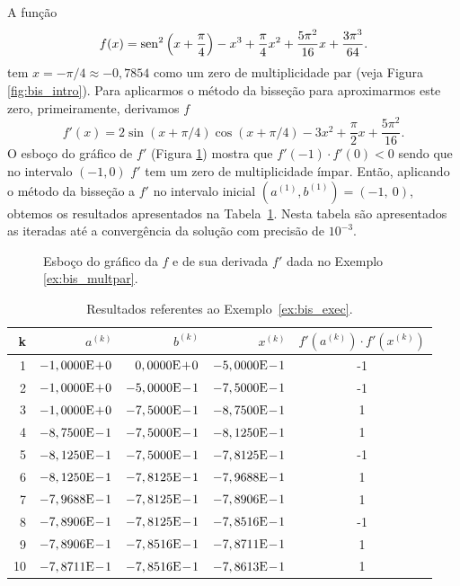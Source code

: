 \begin{ex}\label{ex:bis_multpar}
  A função
\begin{equation}
  f(x) = \operatorname{sen}^2\left(x+\frac{\pi}{4}\right) - x^3 + \frac{\pi}{4}x^2 + \frac{5\pi^2}{16}x + \frac{3\pi^3}{64}.
\end{equation}
tem $x=-\pi/4\approx -0,7854$ como um zero de multiplicidade par (veja Figura \ref{fig:bis_intro}). Para aplicarmos o método da bisseção para aproximarmos este zero, primeiramente, derivamos $f$
\begin{equation}
  f'(x) = 2\sin(x+\pi/4)\cos(x+\pi/4) - 3x^2 + \frac{\pi}{2}x + \frac{5\pi^2}{16}.
\end{equation}
O esboço do gráfico de $f'$ (Figura \ref{fig:bis_multpar}) mostra que $f'(-1)\cdot f'(0) < 0$ sendo que no intervalo $(-1, 0)$ $f'$ tem um zero de multiplicidade ímpar. Então, aplicando o método da bisseção a $f'$ no intervalo inicial $(a^{(1)}, b^{(1)}) = (-1, ~0)$, obtemos os resultados apresentados na Tabela~\ref{tab:bis_multpar}. Nesta tabela são apresentados as iteradas até a convergência da solução com precisão de $10^{-3}$.

\begin{figure}[h!]
  \centering
  \caption{Esboço do gráfico da $f$ e de sua derivada $f'$ dada no Exemplo \ref{ex:bis_multpar}.}
  \label{fig:bis_multpar}
\end{figure}

\begin{table}[h!]
  \centering
  \caption{Resultados referentes ao Exemplo~\ref{ex:bis_exec}.}
  \begin{tabular}{r|rr|r|c}
    k & $a^{(k)}$ & $b^{(k)}$ & $x^{(k)}$ & $f'(a^{(k)})\cdot f'(x^{(k)})$\\\hline
    1 & $-1,0000\mathrm{E}\!+\!0$ & $0,0000\mathrm{E}\!+\!0$ & $-5,0000\mathrm{E}\!-\!1$ & -1 \\
    2 & $-1,0000\mathrm{E}\!+\!0$ & $-5,0000\mathrm{E}\!-\!1$ & $-7,5000\mathrm{E}\!-\!1$ & -1 \\
    3 & $-1,0000\mathrm{E}\!+\!0$ & $-7,5000\mathrm{E}\!-\!1$ & $-8,7500\mathrm{E}\!-\!1$ & 1 \\
    4 & $-8,7500\mathrm{E}\!-\!1$ & $-7,5000\mathrm{E}\!-\!1$ & $-8,1250\mathrm{E}\!-\!1$ &  1 \\
    5 & $-8,1250\mathrm{E}\!-\!1$ & $-7,5000\mathrm{E}\!-\!1$ & $-7,8125\mathrm{E}\!-\!1$ & -1 \\
    6 & $-8,1250\mathrm{E}\!-\!1$ & $-7,8125\mathrm{E}\!-\!1$ & $-7,9688\mathrm{E}\!-\!1$ & 1 \\
    7 & $-7,9688\mathrm{E}\!-\!1$ & $-7,8125\mathrm{E}\!-\!1$ & $-7,8906\mathrm{E}\!-\!1$ & 1 \\
    8 & $-7,8906\mathrm{E}\!-\!1$ & $-7,8125\mathrm{E}\!-\!1$ & $-7,8516\mathrm{E}\!-\!1$ & -1 \\
    9 & $-7,8906\mathrm{E}\!-\!1$ & $-7,8516\mathrm{E}\!-\!1$ & $-7,8711\mathrm{E}\!-\!1$ & 1 \\
    10 & $-7,8711\mathrm{E}\!-\!1$ & $-7,8516\mathrm{E}\!-\!1$ & $-7,8613\mathrm{E}\!-\!1$ & 1 \\\hline
  \end{tabular}
  \label{tab:bis_multpar}
\end{table}


\end{ex}
